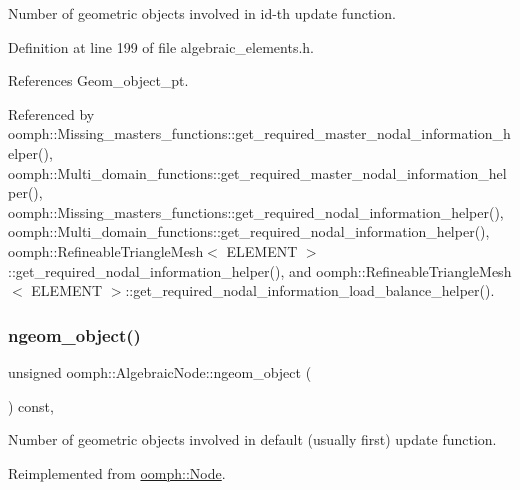 Number of geometric objects involved in id-\/th update function. 



Definition at line 199 of file algebraic\+\_\+elements.\+h.



References Geom\+\_\+object\+\_\+pt.



Referenced by oomph\+::\+Missing\+\_\+masters\+\_\+functions\+::get\+\_\+required\+\_\+master\+\_\+nodal\+\_\+information\+\_\+helper(), oomph\+::\+Multi\+\_\+domain\+\_\+functions\+::get\+\_\+required\+\_\+master\+\_\+nodal\+\_\+information\+\_\+helper(), oomph\+::\+Missing\+\_\+masters\+\_\+functions\+::get\+\_\+required\+\_\+nodal\+\_\+information\+\_\+helper(), oomph\+::\+Multi\+\_\+domain\+\_\+functions\+::get\+\_\+required\+\_\+nodal\+\_\+information\+\_\+helper(), oomph\+::\+Refineable\+Triangle\+Mesh$<$ E\+L\+E\+M\+E\+N\+T $>$\+::get\+\_\+required\+\_\+nodal\+\_\+information\+\_\+helper(), and oomph\+::\+Refineable\+Triangle\+Mesh$<$ E\+L\+E\+M\+E\+N\+T $>$\+::get\+\_\+required\+\_\+nodal\+\_\+information\+\_\+load\+\_\+balance\+\_\+helper().

\mbox{\label{classoomph_1_1AlgebraicNode_a10f49849e0942e68c6791810ffc6fb31}} 
\subsubsection{\texorpdfstring{ngeom\+\_\+object()}{ngeom\_object()}\hspace{0.1cm}{\footnotesize\ttfamily [2/2]}}
{\footnotesize\ttfamily unsigned oomph\+::\+Algebraic\+Node\+::ngeom\+\_\+object (\begin{DoxyParamCaption}{ }\end{DoxyParamCaption}) const\hspace{0.3cm}{\ttfamily [inline]}, {\ttfamily [virtual]}}



Number of geometric objects involved in default (usually first) update function. 



Reimplemented from \hyperlink{classoomph_1_1Node_a2c0fb79493f94d2ce19736737ebf5447}{oomph\+::\+Node}.



